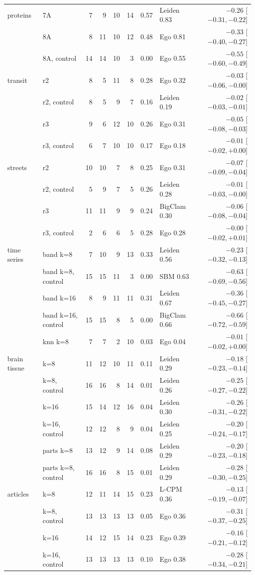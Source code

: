 \begin{longtable*}{llrrrrrlr}
\hline
proteins & 7A & 7 & 9 & 10 & 14 & 0.57 & Leiden 0.83 & $-0.26$ [$-0.31, -0.22$] \\
 & 8A & 8 & 11 & 10 & 12 & 0.48 & Ego 0.81 & $-0.33$ [$-0.40, -0.27$] \\
 & 8A, control & 14 & 14 & 10 & 3 & 0.00 & Ego 0.55 & $-0.55$ [$-0.60, -0.49$] \\
\hline
transit & r2 & 8 & 5 & 11 & 8 & 0.28 & Ego 0.32 & $-0.03$ [$-0.06, -0.00$] \\
 & r2, control & 8 & 5 & 9 & 7 & 0.16 & Leiden 0.19 & $-0.02$ [$-0.03, -0.01$] \\
 & r3 & 9 & 6 & 12 & 10 & 0.26 & Ego 0.31 & $-0.05$ [$-0.08, -0.03$] \\
 & r3, control & 6 & 7 & 10 & 10 & 0.17 & Ego 0.18 & $-0.01$ [$-0.02, +0.00$] \\
\hline
streets & r2 & 10 & 10 & 7 & 8 & 0.25 & Ego 0.31 & $-0.07$ [$-0.09, -0.04$] \\
 & r2, control & 5 & 9 & 7 & 5 & 0.26 & Leiden 0.28 & $-0.01$ [$-0.03, -0.00$] \\
 & r3 & 11 & 11 & 9 & 9 & 0.24 & BigClam 0.30 & $-0.06$ [$-0.08, -0.04$] \\
 & r3, control & 2 & 6 & 6 & 5 & 0.28 & Ego 0.28 & $-0.00$ [$-0.02, +0.01$] \\
\hline
time series & band k=8 & 7 & 10 & 9 & 13 & 0.33 & Leiden 0.56 & $-0.23$ [$-0.32, -0.13$] \\
 & band k=8, control & 15 & 15 & 11 & 3 & 0.00 & SBM 0.63 & $-0.63$ [$-0.69, -0.56$] \\
 & band k=16 & 8 & 9 & 11 & 11 & 0.31 & Leiden 0.67 & $-0.36$ [$-0.45, -0.27$] \\
 & band k=16, control & 15 & 15 & 8 & 5 & 0.00 & BigClam 0.66 & $-0.66$ [$-0.72, -0.59$] \\
 & knn k=8 & 7 & 7 & 2 & 10 & 0.03 & Ego 0.04 & $-0.01$ [$-0.02, +0.00$] \\
\hline
brain tissue & k=8 & 11 & 12 & 10 & 11 & 0.11 & Leiden 0.29 & $-0.18$ [$-0.23, -0.14$] \\
 & k=8, control & 16 & 16 & 8 & 14 & 0.01 & Leiden 0.26 & $-0.25$ [$-0.27, -0.22$] \\
 & k=16 & 15 & 14 & 12 & 16 & 0.04 & Leiden 0.30 & $-0.26$ [$-0.31, -0.22$] \\
 & k=16, control & 12 & 12 & 8 & 9 & 0.04 & Leiden 0.25 & $-0.20$ [$-0.24, -0.17$] \\
 & parts k=8 & 13 & 12 & 9 & 14 & 0.08 & Leiden 0.29 & $-0.20$ [$-0.23, -0.18$] \\
 & parts k=8, control & 16 & 16 & 8 & 15 & 0.01 & Leiden 0.29 & $-0.28$ [$-0.30, -0.25$] \\
\hline
articles & k=8 & 12 & 11 & 14 & 15 & 0.23 & L-CPM 0.36 & $-0.13$ [$-0.19, -0.07$] \\
 & k=8, control & 13 & 13 & 13 & 13 & 0.05 & Ego 0.36 & $-0.31$ [$-0.37, -0.25$] \\
 & k=16 & 14 & 12 & 15 & 14 & 0.23 & Ego 0.39 & $-0.16$ [$-0.21, -0.12$] \\
 & k=16, control & 13 & 13 & 13 & 13 & 0.10 & Ego 0.38 & $-0.28$ [$-0.34, -0.21$] \\
\hline
\end{longtable*}

